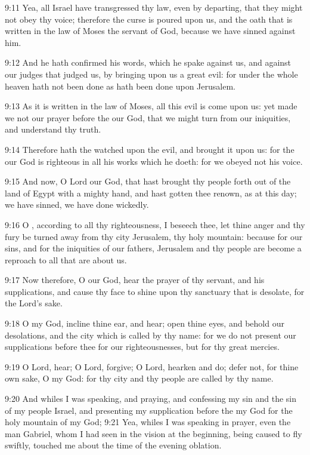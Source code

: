 9:11 Yea, all Israel have transgressed thy law, even by departing, that they might not obey thy voice; therefore the curse is poured upon us, and the oath that is written in the law of Moses the servant of God, because we have sinned against him.

9:12 And he hath confirmed his words, which he spake against us, and against our judges that judged us, by bringing upon us a great evil: for under the whole heaven hath not been done as hath been done upon Jerusalem.

9:13 As it is written in the law of Moses, all this evil is come upon us: yet made we not our prayer before the \LORD our God, that we might turn from our iniquities, and understand thy truth.

9:14 Therefore hath the \LORD watched upon the evil, and brought it upon us: for the \LORD our God is righteous in all his works which he doeth: for we obeyed not his voice.

9:15 And now, O Lord our God, that hast brought thy people forth out of the land of Egypt with a mighty hand, and hast gotten thee renown, as at this day; we have sinned, we have done wickedly.

9:16 O \LORD, according to all thy righteousness, I beseech thee, let thine anger and thy fury be turned away from thy city Jerusalem, thy holy mountain: because for our sins, and for the iniquities of our fathers, Jerusalem and thy people are become a reproach to all that are about us.

9:17 Now therefore, O our God, hear the prayer of thy servant, and his supplications, and cause thy face to shine upon thy sanctuary that is desolate, for the Lord's sake.

9:18 O my God, incline thine ear, and hear; open thine eyes, and behold our desolations, and the city which is called by thy name: for we do not present our supplications before thee for our righteousnesses, but for thy great mercies.

9:19 O Lord, hear; O Lord, forgive; O Lord, hearken and do; defer not, for thine own sake, O my God: for thy city and thy people are called by thy name.

9:20 And whiles I was speaking, and praying, and confessing my sin and the sin of my people Israel, and presenting my supplication before the \LORD my God for the holy mountain of my God; 9:21 Yea, whiles I was speaking in prayer, even the man Gabriel, whom I had seen in the vision at the beginning, being caused to fly swiftly, touched me about the time of the evening oblation.

